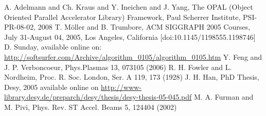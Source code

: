 \documentclass[a4paper,11pt]{article}
\begin{document}
\begin{thebibliography}{99}
 A. Adelmann and Ch. Kraus and Y. Ineichen and  J. Yang,
The OPAL (Object Oriented Parallel Accelerator Library) 
              Framework, Paul Scherrer Institute, PSI-PR-08-02, 2008
 T. M\"oller and B. Trumbore,
 ACM SIGGRAPH 2005 Courses, July 31-August 04, 2005, Los Angeles, California   [doi:10.1145/1198555.1198746] 
 D. Sunday,
 available online on:\\ \href{http://softsurfer.com/Archive/algorithm\_0105/algorithm\_0105.htm}{http://softsurfer.com/Archive/algorithm\_0105/algorithm\_0105.htm}
 Y. Feng and J. P. Verboncoeur,
Phys.Plasmas 13, 073105 (2006)
 R. H. Fowler and L. Nordheim, 
Proc. R. Soc. London, Ser. A 119, 173 (1928)
 J. H. Han, PhD Thesis, Desy, 2005 available online on \href{http://www-library.desy.de/preparch/desy/thesis/desy-thesis-05-045.pdf}{http://www-library.desy.de/preparch/desy/thesis/desy-thesis-05-045.pdf}
 M. A. Furman and M. Pivi, 
 Phys. Rev. ST Accel. Beams 5, 124404 (2002)
\end{thebibliography} 
\end{document}
